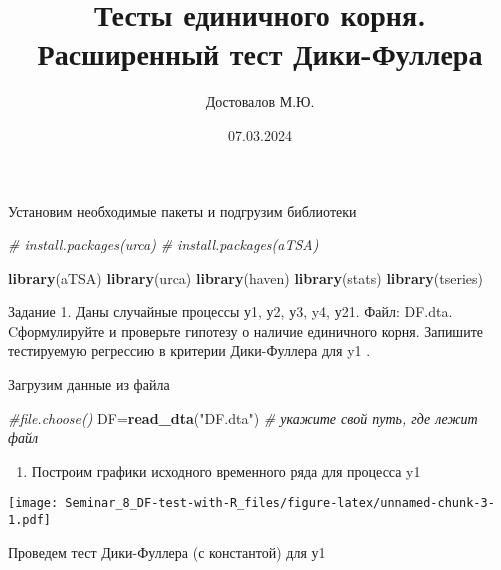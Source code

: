 \documentclass[
]{article}
\title{Тесты единичного корня. Расширенный тест Дики-Фуллера}
\author{Достовалов М.Ю.}
\date{07.03.2024}
\newenvironment{Shaded}{\begin{snugshade}}{\end{snugshade}}
\newcommand{\AttributeTok}[1]{\textcolor[rgb]{0.13,0.29,0.53}{#1}}
\newcommand{\CommentTok}[1]{\textcolor[rgb]{0.56,0.35,0.01}{\textit{#1}}}
\newcommand{\FunctionTok}[1]{\textcolor[rgb]{0.13,0.29,0.53}{\textbf{#1}}}
\newcommand{\NormalTok}[1]{#1}
\newcommand{\OtherTok}[1]{\textcolor[rgb]{0.56,0.35,0.01}{#1}}
\newcommand{\SpecialCharTok}[1]{\textcolor[rgb]{0.81,0.36,0.00}{\textbf{#1}}}
\newcommand{\StringTok}[1]{\textcolor[rgb]{0.31,0.60,0.02}{#1}}
\providecommand{\tightlist}{%
  \setlength{\itemsep}{0pt}\setlength{\parskip}{0pt}}
\begin{document}
\maketitle

Установим необходимые пакеты и подгрузим библиотеки

\begin{Shaded}
\begin{Highlighting}[]
\CommentTok{\# install.packages(\textquotesingle{}urca\textquotesingle{})}
\CommentTok{\# install.packages(\textquotesingle{}aTSA\textquotesingle{})}

\FunctionTok{library}\NormalTok{(aTSA)}
\FunctionTok{library}\NormalTok{(urca)}
\FunctionTok{library}\NormalTok{(haven)}
\FunctionTok{library}\NormalTok{(stats)}
\FunctionTok{library}\NormalTok{(tseries)}
\end{Highlighting}
\end{Shaded}

Задание 1. Даны случайные процессы у1, у2, у3, y4, у21. Файл: DF.dta.
Cформулируйте и проверьте гипотезу о наличие единичного корня. Запишите
тестируемую регрессию в критерии Дики-Фуллера для y1 .

Загрузим данные из файла

\begin{Shaded}
\begin{Highlighting}[]
\CommentTok{\#file.choose()}
\NormalTok{DF}\OtherTok{=}\FunctionTok{read\_dta}\NormalTok{(}\StringTok{"DF.dta"}\NormalTok{) }\CommentTok{\# укажите свой путь, где лежит файл}
\end{Highlighting}
\end{Shaded}

\begin{enumerate}
\def\labelenumi{\arabic{enumi}.}
\tightlist
\item
  Построим графики исходного временного ряда для процесса y1
\end{enumerate}

\begin{Shaded}
\end{Shaded}

\texttt{[image: Seminar\_8\_DF-test-with-R\_files/figure-latex/unnamed-chunk-3-1.pdf]}

Проведем тест Дики-Фуллера (с константой) для у1
\end{document}
